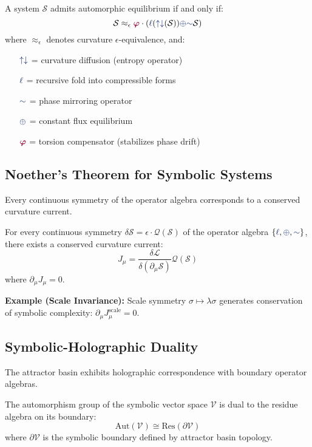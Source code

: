 \begin{theorem}
A system $\mathcal{S}$ admits automorphic equilibrium if and only if:
\[ \mathcal{S} \approx_{\epsilon} \gold \cdot \left( \lha(\repflow(\mathcal{S})) \fuse \reflec \mathcal{S} \right) \]
where $\approx_{\epsilon}$ denotes curvature $\epsilon$-equivalence, and:
\begin{itemize}
   \item[$\repflow$] = curvature diffusion (entropy operator)
   \item[$\lha$] = recursive fold into compressible forms
   \item[$\reflec$] = phase mirroring operator
   \item[$\fuse$] = constant flux equilibrium
   \item[$\gold$] = torsion compensator (stabilizes phase drift)
\end{itemize}
\end{theorem}

\subsection{Noether's Theorem for Symbolic Systems}
Every continuous symmetry of the operator algebra corresponds to a conserved curvature current.

\begin{theorem}
For every continuous symmetry $\delta \mathcal{S} = \epsilon \cdot \mathcal{Q}(\mathcal{S})$ of the operator algebra $\{\lha, \fuse, \reflec\}$, there exists a conserved curvature current:
\[ J_\mu = \frac{\delta \mathcal{L}}{\delta (\partial_\mu \mathcal{S})} \mathcal{Q}(\mathcal{S}) \]
where $\partial_\mu J_\mu = 0$.
\end{theorem}

\textbf{Example (Scale Invariance):} Scale symmetry $\sigma \mapsto \lambda \sigma$ generates conservation of symbolic complexity: $\partial_\mu J_\mu^{\text{scale}} = 0$.

\subsection{Symbolic-Holographic Duality}
The attractor basin exhibits holographic correspondence with boundary operator algebras.

\begin{theorem}
The automorphism group of the symbolic vector space $\mathcal{V}$ is dual to the residue algebra on its boundary:
\[ \text{Aut}(\mathcal{V}) \cong \text{Res}(\partial \mathcal{V}) \]
where $\partial \mathcal{V}$ is the symbolic boundary defined by attractor basin topology.
\end{theorem}

